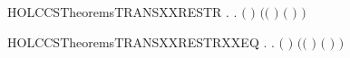 \begin{SaveVerbatim}{HOLCCSTheoremsTRANSXXRESTR}
\HOLTokenTurnstile{} \HOLSymConst{\HOLTokenForall{}}   .
          \HOLTokenTransBegin{}\HOLTokenTransEnd {} \HOLSymConst{\HOLTokenImp{}}
       \HOLSymConst{\HOLTokenExists{}} .
           \ensuremath{(} \HOLSymConst{\ensuremath{=}}   \ensuremath{)} \HOLSymConst{\HOLTokenConj{}}  \HOLTokenTransBegin{}\HOLTokenTransEnd {} \HOLSymConst{\HOLTokenConj{}}
           \ensuremath{(}\ensuremath{(} \HOLSymConst{\ensuremath{=}} \HOLConst{\ensuremath{\tau}}\ensuremath{)} \HOLSymConst{\HOLTokenDisj{}} \ensuremath{(} \HOLSymConst{\ensuremath{=}}  \ensuremath{)} \HOLSymConst{\HOLTokenConj{}}  \HOLConst{\HOLTokenNotIn{}}  \HOLSymConst{\HOLTokenConj{}}   \HOLConst{\HOLTokenNotIn{}} \ensuremath{)}
\end{SaveVerbatim}
\newcommand{\HOLCCSTheoremsTRANSXXRESTR}{\UseVerbatim{HOLCCSTheoremsTRANSXXRESTR}}
\begin{SaveVerbatim}{HOLCCSTheoremsTRANSXXRESTRXXEQ}
\HOLTokenTurnstile{} \HOLSymConst{\HOLTokenForall{}}   .
          \HOLTokenTransBegin{}\HOLTokenTransEnd {} \HOLSymConst{\HOLTokenEquiv{}}
       \HOLSymConst{\HOLTokenExists{}} .
           \ensuremath{(} \HOLSymConst{\ensuremath{=}}   \ensuremath{)} \HOLSymConst{\HOLTokenConj{}}  \HOLTokenTransBegin{}\HOLTokenTransEnd {} \HOLSymConst{\HOLTokenConj{}}
           \ensuremath{(}\ensuremath{(} \HOLSymConst{\ensuremath{=}} \HOLConst{\ensuremath{\tau}}\ensuremath{)} \HOLSymConst{\HOLTokenDisj{}} \ensuremath{(} \HOLSymConst{\ensuremath{=}}  \ensuremath{)} \HOLSymConst{\HOLTokenConj{}}  \HOLConst{\HOLTokenNotIn{}}  \HOLSymConst{\HOLTokenConj{}}   \HOLConst{\HOLTokenNotIn{}} \ensuremath{)}
\end{SaveVerbatim}
